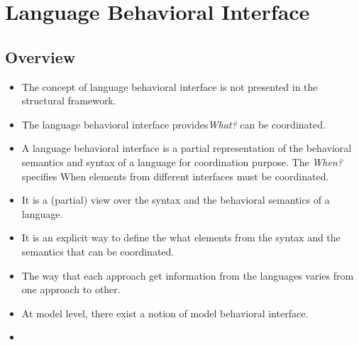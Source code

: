 \section{Language Behavioral Interface}
	\subsection{Overview}
	\begin{itemize}
		\item The concept of language behavioral interface is not presented in the structural framework. 
		\item The language behavioral interface provides\emph{What?} can be coordinated. 
		\item A language behavioral interface is a partial representation of the behavioral semantics and syntax of a language for coordination purpose. The \emph{When?} specifies When elements from different interfaces must be coordinated. 
		\item It is a (partial) view over the syntax and the behavioral semantics of a language.
		\item It is an explicit way to define the what elements from the syntax and the semantics that can be coordinated. 
		\item The way that each approach get information from the languages varies from one approach to other.
		\item At model level, there exist a notion of model behavioral interface.
		\item {}
	\end{itemize}




